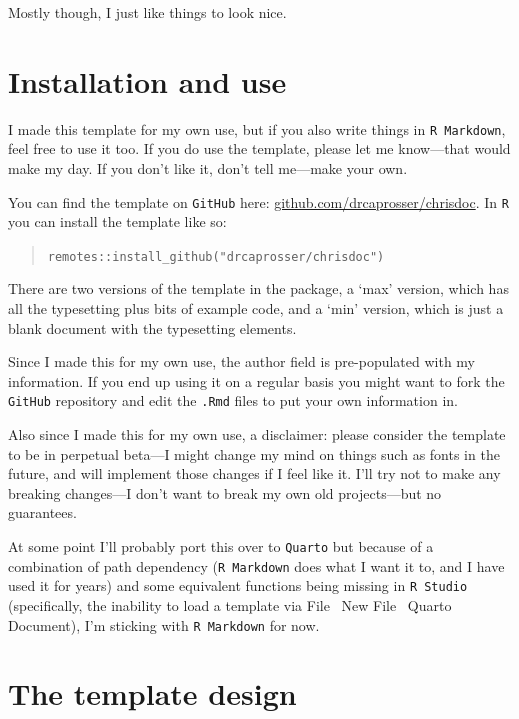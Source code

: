 \documentclass[
  a4paper,
  twoside]{article}
\begin{document}
Mostly though, I just like things to look nice.

\section{Installation and use}\label{installation-and-use}

I made this template for my own use, but if you also write things in \texttt{R\ Markdown}, feel free to use it too. If you do use the template, please let me know---that would make my day. If you don't like it, don't tell me---make your own.

You can find the template on \texttt{GitHub} here: \href{https://github.com/drcaprosser/chrisdoc}{github.com/drcaprosser/chrisdoc}. In \texttt{R} you can install the template like so:

\begin{quote}
\texttt{remotes::install\_github("drcaprosser/chrisdoc")}
\end{quote}

There are two versions of the template in the package, a `max' version, which has all the typesetting plus bits of example code, and a `min' version, which is just a blank document with the typesetting elements.

Since I made this for my own use, the author field is pre-populated with my information. If you end up using it on a regular basis you might want to fork the \texttt{GitHub} repository and edit the \texttt{.Rmd} files to put your own information in.

Also since I made this for my own use, a disclaimer: please consider the template to be in perpetual beta---I might change my mind on things such as fonts in the future, and will implement those changes if I feel like it. I'll try not to make any breaking changes---I don't want to break my own old projects---but no guarantees.

At some point I'll probably port this over to \texttt{Quarto} but because of a combination of path dependency (\texttt{R\ Markdown} does what I want it to, and I have used it for years) and some equivalent functions being missing in \texttt{R\ Studio} (specifically, the inability to load a template via File \rightarrow~New File \rightarrow~Quarto Document), I'm sticking with \texttt{R\ Markdown} for now.

\section{The template design}\label{the-template-design}
\end{document}
